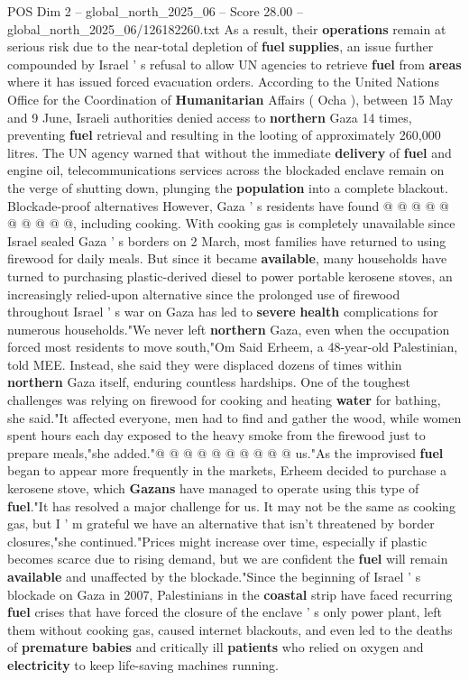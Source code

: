 \begin{textsample}{POS Dim 2 – global\_north\_2025\_06 – Score 28.00 – global\_north\_2025\_06/126182260.txt}
As a result, their \textbf{operations} remain at serious risk due to the near-total depletion of \textbf{fuel} \textbf{supplies}, an issue further compounded by Israel ' s refusal to allow UN agencies to retrieve \textbf{fuel} from \textbf{areas} where it has issued forced evacuation orders.
According to the United Nations Office for the Coordination of \textbf{Humanitarian} Affairs ( Ocha ), between 15 May and 9 June, Israeli authorities denied access to \textbf{northern} Gaza 14 times, preventing \textbf{fuel} retrieval and resulting in the looting of approximately 260,000 litres.
The UN agency warned that without the immediate \textbf{delivery} of \textbf{fuel} and engine oil, telecommunications services across the blockaded enclave remain on the verge of shutting down, plunging the \textbf{population} into a complete blackout.
Blockade-proof alternatives However, Gaza ' s residents have found @ @ @ @ @ @ @ @ @ @, including cooking.
With cooking gas is completely unavailable since Israel sealed Gaza ' s borders on 2 March, most families have returned to using firewood for daily meals.
But since it became \textbf{available}, many households have turned to purchasing plastic-derived diesel to power portable kerosene stoves, an increasingly relied-upon alternative since the prolonged use of firewood throughout Israel ' s war on Gaza has led to \textbf{severe} \textbf{health} complications for numerous households."We never left \textbf{northern} Gaza, even when the occupation forced most residents to move south,"Om Said Erheem, a 48-year-old Palestinian, told MEE.
Instead, she said they were displaced dozens of times within \textbf{northern} Gaza itself, enduring countless hardships.
One of the toughest challenges was relying on firewood for cooking and heating \textbf{water} for bathing, she said."It affected everyone, men had to find and gather the wood, while women spent hours each day exposed to the heavy smoke from the firewood just to prepare meals,"she added."@ @ @ @ @ @ @ @ @ @ us."As the improvised \textbf{fuel} began to appear more frequently in the markets, Erheem decided to purchase a kerosene stove, which \textbf{Gazans} have managed to operate using this type of \textbf{fuel}."It has resolved a major challenge for us.
It may not be the same as cooking gas, but I ' m grateful we have an alternative that isn't threatened by border closures,"she continued."Prices might increase over time, especially if plastic becomes scarce due to rising demand, but we are confident the \textbf{fuel} will remain \textbf{available} and unaffected by the blockade."Since the beginning of Israel ' s blockade on Gaza in 2007, Palestinians in the \textbf{coastal} strip have faced recurring \textbf{fuel} crises that have forced the closure of the enclave ' s only power plant, left them without cooking gas, caused internet blackouts, and even led to the deaths of \textbf{premature} \textbf{babies} and critically ill \textbf{patients} who relied on oxygen and \textbf{electricity} to keep life-saving machines running.

\end{textsample}
